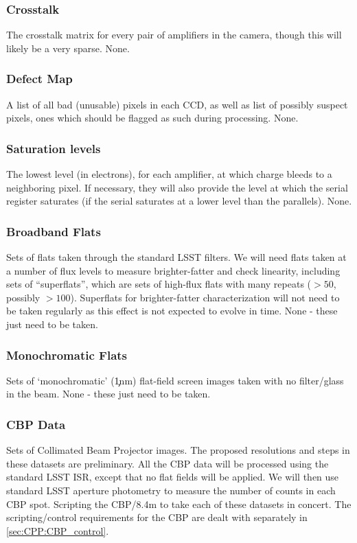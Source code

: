 \subsubsection{Crosstalk}\label{sec:CPP:inputs:crosstalk}
\cameraTeam
The crosstalk matrix for every pair of amplifiers in the camera, though this will likely be a very sparse.
\alg None.


\subsubsection{Defect Map}\label{sec:CPP:inputs:defectList} 
\cameraTeam
A list of all bad (unusable) pixels in each CCD, as well as list of possibly suspect pixels, \ie ones which should be flagged as such during processing.
\alg None.


\subsubsection{Saturation levels}\label{sec:CPP:inputs:saturationLevel}
\cameraTeam
The lowest level (in electrons), for each amplifier, at which charge bleeds to a neighboring pixel. If necessary, they will also provide the level at which the serial register saturates (\ie if the serial saturates at a lower level than the parallels).
\alg None.


\subsubsection{Broadband Flats}\label{sec:CPP:inputs:broadFlat}
Sets of flats taken through the standard LSST filters. We will need flats taken at a number of flux levels to measure brighter-fatter and check linearity, including sets of ``superflats'', which are sets of high-flux flats with many repeats ($>50$, possibly $>100$). Superflats for brighter-fatter characterization will not need to be taken regularly as this effect is not expected to evolve in time.
\alg None - these just need to be taken.


\subsubsection{Monochromatic Flats}\label{sec:CPP:inputs:monoFlat}
Sets of `monochromatic' (\c 1nm) flat-field screen images taken with no filter/glass in the beam.
\alg None - these just need to be taken.


\subsubsection{CBP Data}\label{sec:CPP:inputs:CBP}
Sets of Collimated Beam Projector images. The proposed resolutions and steps in these datasets are preliminary. All the CBP data will be processed using the standard LSST ISR, except that no flat fields will be applied. We will then use standard LSST aperture photometry to measure the number of counts in each CBP spot.
\alg Scripting the CBP/8.4m to take each of these datasets in concert. The scripting/control requirements for the CBP are dealt with separately in \secsymbol\ref{sec:CPP:CBP_control}.


